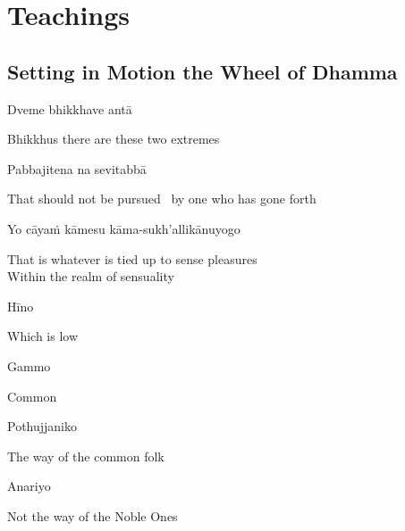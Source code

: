 
\chapter{Teachings}

\section{Setting in Motion the Wheel of Dhamma}
\label{wheel-of-dhamma-abridged}

\begin{leader}
\end{leader}

Dveme bhikkhave antā

\begin{cprenglish}
  Bhikkhus there are these two extremes
\end{cprenglish}

Pabbajitena na sevitabbā

\begin{cprenglish}
  That should not be pursued \breathmark\ by one who has gone forth
\end{cprenglish}

Yo cāyaṁ kāmesu kāma-sukh’allikānuyogo

\begin{cprenglish}
  That is whatever is tied up to sense pleasures\\
  Within the realm of sensuality
\end{cprenglish}

Hīno

\begin{cprenglish}
  Which is low
\end{cprenglish}

Gammo

\begin{cprenglish}
  Common
\end{cprenglish}

Pothujjaniko

\begin{cprenglish}
  The way of the common folk
\end{cprenglish}

Anariyo

\begin{cprenglish}
  Not the way of the Noble Ones
\end{cprenglish}

